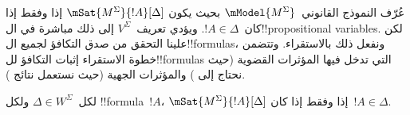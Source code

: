 \documentclass[../../../include/open-logic-section]{subfiles}
\begin{document}


عُرّف النموذج القانوني~$\mModel{M^\Sigma}$ بحيث يكون
$\mSat{M^\Sigma}{!A}[\Delta]$ إذا وفقط إذا كان~$!A \in \Delta$.
ويؤدي تعريف~$V^\Sigma$ إلى ذلك مباشرة في ال!!{propositional
variable}s.
لكن علينا التحقق من صدق التكافؤ لجميع ال!!{formula}s، ونفعل ذلك
بالاستقراء. وتتضمن خطوة الاستقراء إثبات التكافؤ لل!!{formula}s التي
تدخل فيها المؤثرات القضوية (حيث نحتاج إلى
) والمؤثرات الجهية (حيث نستعمل نتائج
).

\begin{prop}[لمّة الصدق]
  لكل~$\Delta \in W^\Sigma$ ولكل !!{formula}~$!A$،
  $\mSat{M^\Sigma}{!A}[\Delta]$ إذا وفقط إذا كان~$!A \in \Delta$.
\end{prop}
\end{document}
